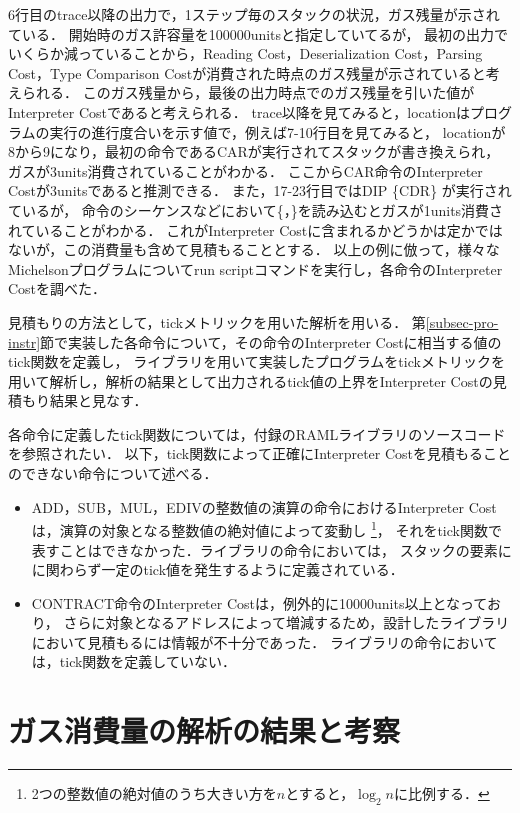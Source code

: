 \documentclass{kuisthesis}
\begin{document}
6行目のtrace以降の出力で，1ステップ毎のスタックの状況，ガス残量が示されている．
開始時のガス許容量を100000unitsと指定していてるが，
最初の出力でいくらか減っていることから，Reading Cost，Deserialization Cost，Parsing Cost，Type Comparison Costが消費された時点のガス残量が示されていると考えられる．
このガス残量から，最後の出力時点でのガス残量を引いた値がInterpreter Costであると考えられる．
trace以降を見てみると，locationはプログラムの実行の進行度合いを示す値で，例えば7-10行目を見てみると，
locationが8から9になり，最初の命令であるCARが実行されてスタックが書き換えられ，ガスが3units消費されていることがわかる．
ここからCAR命令のInterpreter Costが3unitsであると推測できる．
また，17-23行目ではDIP \{CDR\} が実行されているが，
命令のシーケンスなどにおいて\{，\}を読み込むとガスが1units消費されていることがわかる．
これがInterpreter Costに含まれるかどうかは定かではないが，この消費量も含めて見積もることとする．
以上の例に倣って，様々なMichelsonプログラムについてrun scriptコマンドを実行し，各命令のInterpreter Costを調べた．

見積もりの方法として，tickメトリックを用いた解析を用いる．
第\ref{subsec-pro-instr}節で実装した各命令について，その命令のInterpreter Costに相当する値のtick関数を定義し，
ライブラリを用いて実装したプログラムをtickメトリックを用いて解析し，解析の結果として出力されるtick値の上界をInterpreter Costの見積もり結果と見なす．

各命令に定義したtick関数については，付録のRAMLライブラリのソースコードを参照されたい．
以下，tick関数によって正確にInterpreter Costを見積もることのできない命令について述べる．
\begin{itemize}
  \item ADD，SUB，MUL，EDIVの整数値の演算の命令におけるInterpreter Costは，演算の対象となる整数値の絶対値によって変動し
  \footnote{2つの整数値の絶対値のうち大きい方を$n$とすると，$\log_2 n$に比例する．}，
  それをtick関数で表すことはできなかった．ライブラリの命令においては，
  スタックの要素にに関わらず一定のtick値を発生するように定義されている．
  \item CONTRACT命令のInterpreter Costは，例外的に10000units以上となっており，
  さらに対象となるアドレスによって増減するため，設計したライブラリにおいて見積もるには情報が不十分であった．
  ライブラリの命令においては，tick関数を定義していない．

\end{itemize}


\section{ガス消費量の解析の結果と考察}
\end{document}
